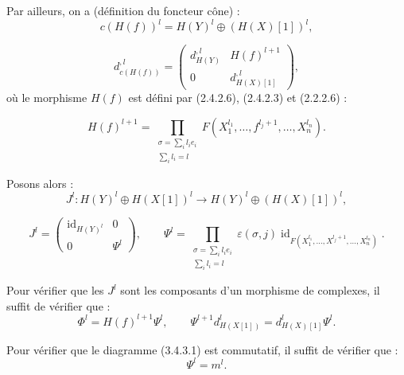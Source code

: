 \clearpage
{}%
\begingroup
\small
\setlength{\abovedisplayskip}{3pt plus 2pt minus 2pt}%
\setlength{\belowdisplayskip}{3pt plus 2pt minus 2pt}%
\setlength{\jot}{2pt}%

Par ailleurs, on a (définition du foncteur cône) :
\[
  c(H(f))^l=H(Y)^l\oplus(H(X)[1])^l,
\]

\begin{equation}
  d_{c(H(f))}^{,l}=
  \begin{pmatrix}
    d_{H(Y)}^{,l} & H(f)^{l+1}\\
    0 & d_{H(X)[1]}^{,l}
  \end{pmatrix},
  \tag{3.4.3.4}
\end{equation}
où le morphisme $H(f)$ est défini par (2.4.2.6), (2.4.2.3) et (2.2.2.6) :

\begin{equation}
  H(f)^{l+1}=
  \prod_{\substack{\sigma=\sum_i l_i e_i\\ \sum_i l_i=l}}
  F(X_1^{l_1},\ldots,f^{l_j+1},\ldots,X_n^{l_n}).
  \tag{3.4.3.5}
\end{equation}

Posons alors :
\[
  J^l\colon H(Y)^l\oplus H(X[1])^l
  \longrightarrow H(Y)^l\oplus(H(X)[1])^l,
\]

\begin{equation}
  J^l=
  \begin{pmatrix}
    \operatorname{id}_{H(Y)^l} & 0\\
    0 & \Psi^l
  \end{pmatrix},
  \qquad
  \Psi^l=
  \prod_{\substack{\sigma=\sum_i l_i e_i\\ \sum_i l_i=l}}
  \varepsilon(\sigma,j)
  \operatorname{id}_{F(X_1^{l_1},\ldots,X^{l_j+1},\ldots,X_n^{l_n})}.
  \tag{3.4.3.6}
\end{equation}

Pour vérifier que les $J^l$ sont les composants d'un morphisme de complexes,
il suffit de vérifier que :
\begin{equation}
  \Phi^l=H(f)^{l+1}\Psi^l,
  \qquad
  \Psi^{l+1}d_{H(X[1])}^{l}=d_{H(X)[1]}^{l}\Psi^l.
  \tag{3.4.3.7}
\end{equation}

Pour vérifier que le diagramme (3.4.3.1) est commutatif, il suffit de vérifier
que :
\begin{equation}
  \Psi^l=m^l.
  \tag{3.4.3.8}
\end{equation}
\endgroup
